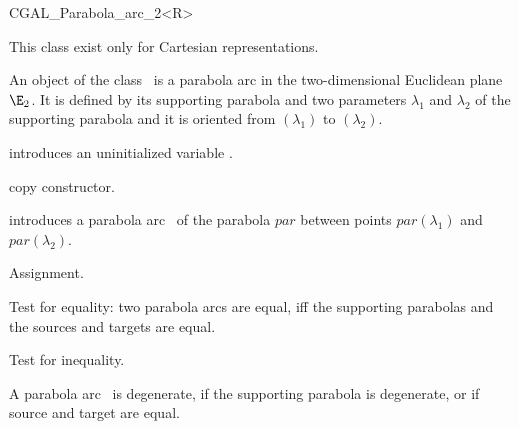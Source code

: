 

\begin{classtemplate}{CGAL_Parabola_arc_2<R>}

This class exist only for Cartesian representations.

  An object  of the class \classname\ is a parabola arc
in the two-dimensional Euclidean plane $\E_2$.  It is defined by its
supporting parabola and two parameters $\lambda_1$ and $\lambda_2$ of
the supporting parabola  and it is oriented from 
$(\lambda_1)$ to $(\lambda_2)$.

\creation
{}


\hidden {}
             {introduces an uninitialized variable \var.}

\hidden {}
 	    {copy constructor.}


\def\CCalternateThreeColumn{\CCtrue}

% 
            {introduces a parabola arc \var\ of the parabola $par$ 
             between points $par(\lambda_1)$ and $par(\lambda_2)$.}


\operations
\threecolumns{3.5cm}{4cm}

\hidden {}
        {Assignment.}

       {Test for equality: two parabola arcs are equal, iff the supporting
        parabolas and the sources and targets are equal.}

       {Test for inequality.}



       {A parabola arc \var\ is degenerate, if the supporting parabola is
        degenerate, or if source and target are equal.}


\end{classtemplate}
